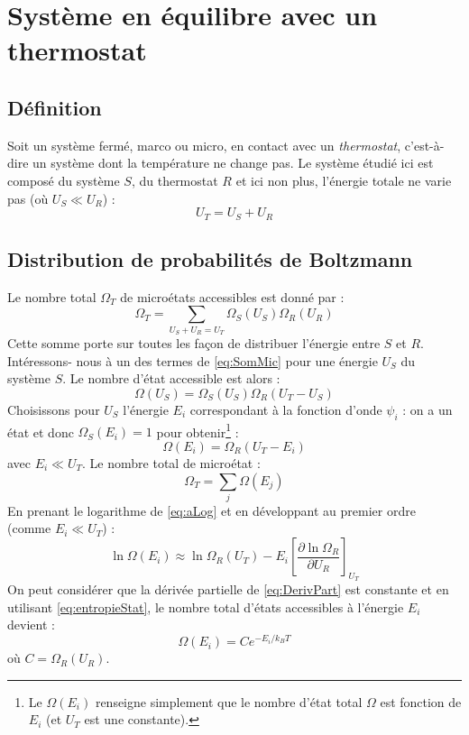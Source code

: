 \documentclass	[11pt, a4paper, openany]{book}
\begin{document}
\chapter{Système en équilibre avec un thermostat}
\section{Définition}
Soit un système fermé, marco ou micro, en contact avec un \textit{thermostat}, c'est-à-dire
un système dont la température ne change pas. Le système étudié ici est composé du système 
$S$, du thermostat $R$ et ici non plus, l'énergie totale ne varie pas (où $U_S \ll U_R$) :
\begin{equation}
U_T = U_S + U_R
\end{equation}

\section{Distribution de probabilités de Boltzmann}
Le nombre total $\Omega_T$ de microétats accessibles est donné par :
\begin{equation}
\Omega_T = \sum_{U_S+U_R=U_T} \Omega_S(U_S)\Omega_R(U_R)
\label{eq:SomMic}
\end{equation}
Cette somme porte sur toutes les façon de distribuer l'énergie entre $S$ et $R$. Intéressons-
nous à  un des termes de \autoref{eq:SomMic} pour une énergie $U_S$ du système $S$. Le nombre
d'état accessible est alors :
\begin{equation}
\Omega(U_S) = \Omega_S(U_S)\Omega_R(U_T-U_S)
\end{equation}
Choisissons pour $U_S$ l'énergie $E_i$ correspondant à la fonction d'onde $\psi_i$ : on a un
état et donc $\Omega_S(E_i) = 1$ pour obtenir\footnote{Le $\Omega(E_i)$ renseigne simplement 
que le nombre d'état total $\Omega$ est fonction de $E_i$ (et $U_T$ est une constante).} :
\begin{equation}
\Omega(E_i) = \Omega_R(U_T-E_i)
\label{eq:aLog}
\end{equation}
avec $E_i \ll U_T$. Le nombre total de microétat : 
\begin{equation}
\Omega_T = \sum_j \Omega(E_j)
\end{equation}
En prenant le logarithme de \autoref{eq:aLog} et en développant au premier ordre (comme $E_i
\ll U_T$) :
\begin{equation}
\ln\Omega(E_i) \approx \ln\Omega_R(U_T) - E_i\left[\dfrac{\partial \ln\Omega_R}{\partial U_R}
\right]_{U_T}
\label{eq:DerivPart}
\end{equation}
On peut considérer que la dérivée partielle de \autoref{eq:DerivPart} est constante et en 
utilisant \autoref{eq:entropieStat}, le nombre total d'états accessibles à l'énergie $E_i$ 
devient :
\begin{equation}
\Omega(E_i) = Ce^{-E_i/k_BT}
\end{equation}
où $C = \Omega_R(U_R)$.\newpage
\end{document}
